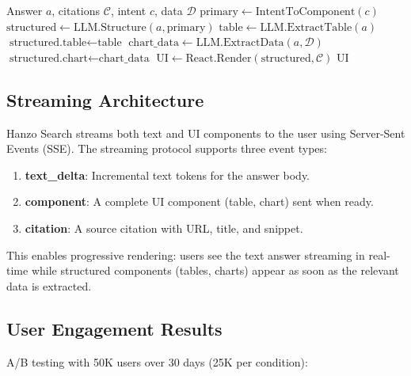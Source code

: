 \begin{algorithm}[H]
\caption{Generative UI Rendering}
\label{alg:genui}
\begin{algorithmic}[1]
\Require Answer $a$, citations $\mathcal{C}$, intent $c$, data $\mathcal{D}$
\State $\text{primary} \gets \text{IntentToComponent}(c)$
\State $\text{structured} \gets \text{LLM.Structure}(a, \text{primary})$
\State {}
    \State $\text{table} \gets \text{LLM.ExtractTable}(a)$
    \State $\text{structured.table} \gets \text{table}$
    \State $\text{chart\_data} \gets \text{LLM.ExtractData}(a, \mathcal{D})$
    \State $\text{structured.chart} \gets \text{chart\_data}$
\EndIf
\State $\text{UI} \gets \text{React.Render}(\text{structured}, \mathcal{C})$
\State \Return $\text{UI}$
\end{algorithmic}
\end{algorithm}

\subsection{Streaming Architecture}

Hanzo Search streams both text and UI components to the user using Server-Sent Events (SSE). The streaming protocol supports three event types:

\begin{enumerate}[leftmargin=1.4em]
    \item \textbf{text\_delta}: Incremental text tokens for the answer body.
    \item \textbf{component}: A complete UI component (table, chart) sent when ready.
    \item \textbf{citation}: A source citation with URL, title, and snippet.
\end{enumerate}

This enables progressive rendering: users see the text answer streaming in real-time while structured components (tables, charts) appear as soon as the relevant data is extracted.

\subsection{User Engagement Results}

A/B testing with 50K users over 30 days (25K per condition):


